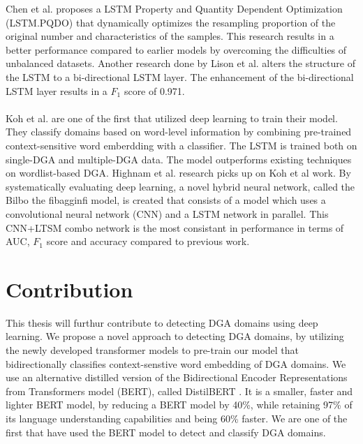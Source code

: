 Chen et al. \cite{Chen} proposes a LSTM Property and Quantity Dependent Optimization (LSTM.PQDO) that dynamically optimizes the resampling proportion of the original number and characteristics of the samples. This research results in a better performance compared to earlier models by overcoming the difficulties of unbalanced datasets. Another research done by Lison et al. \cite{Lison} alters the structure of the LSTM to a bi-directional LSTM layer. The enhancement of the bi-directional LSTM layer results in a $F_1$ score of 0.971.\\\\
Koh et al. \cite{Koh} are one of the first that utilized deep learning to train their model. They classify domains based on word-level information by combining pre-trained context-sensitive word emberdding with a classifier. The LSTM is trained both on single-DGA and multiple-DGA data. The model outperforms existing techniques on wordlist-based DGA.  
Highnam et al. \cite{Highnam} research picks up on Koh et al \cite{Koh} work. By systematically evaluating deep learning, a novel hybrid neural network, called the Bilbo the fibagginfi model, is created that consists of a model which uses a convolutional neural network (CNN) and a LSTM network in parallel. 
This CNN+LTSM combo network is the most consistant in performance in terms of AUC, $F_1$ score and accuracy compared to previous work. 
\section{Contribution}
This thesis will furthur contribute to detecting DGA domains using deep learning. We propose a novel approach to detecting DGA domains, by utilizing the newly developed transformer models to pre-train our model that bidirectionally classifies context-senstive word embedding of DGA domains. We use an alternative distilled version of the Bidirectional Encoder Representations from Transformers model (BERT), called DistilBERT \cite{Sanh2019DistilBERTAD}. It is a smaller, faster and lighter BERT model, by reducing a BERT model by 40\%, while retaining 97\% of its language understanding capabilities and being 60\% faster. We are one of the first that have used the BERT model to detect and classify DGA domains.